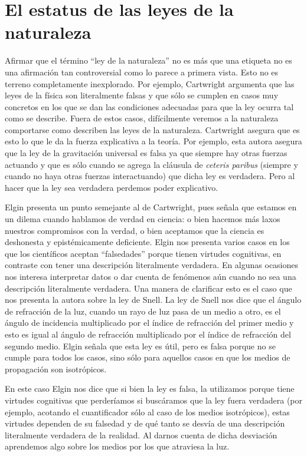 \section{El estatus de las leyes de la naturaleza}

\noindent Afirmar que el término ``ley de la naturaleza'' no es más que una etiqueta no es una afirmación tan controversial como lo parece a primera vista. Esto no es terreno completamente inexplorado. Por ejemplo, Cartwright \citeyear{Cartwright1983} argumenta que las leyes de la física son literalmente falsas y que sólo se cumplen en casos muy concretos en los que se dan las condiciones adecuadas para que la ley ocurra tal como se describe. Fuera de estos casos, difícilmente veremos a la naturaleza comportarse como describen las leyes de la naturaleza. Cartwright asegura que es esto lo que le da la fuerza explicativa a la teoría. Por ejemplo, esta autora asegura que la ley de la gravitación universal es falsa ya que siempre hay otras fuerzas actuando y que es sólo cuando se agrega la cláusula de \textit{ceteris paribus} (siempre y cuando no haya otras fuerzas interactuando) que dicha ley es verdadera. Pero al hacer que la ley sea verdadera perdemos poder explicativo.

Elgin \citeyear{Elgin2004} presenta un punto semejante al de Cartwright, pues señala que estamos en un dilema cuando hablamos de verdad en ciencia: o bien hacemos más laxos nuestros compromisos con la verdad, o bien aceptamos que la ciencia es deshonesta y epistémicamente deficiente. Elgin nos presenta varios casos en los que los científicos aceptan ``falsedades'' porque tienen virtudes cognitivas, en contraste con tener una descripción literalmente verdadera. En algunas ocasiones nos interesa interpretar datos o dar cuenta de fenómenos aún cuando no sea una descripción literalmente verdadera. Una manera de clarificar esto es el caso que nos presenta la autora sobre la ley de Snell. La ley de Snell nos dice que el ángulo de refracción de la luz, cuando un rayo de luz pasa de un medio a otro, es el ángulo de incidencia multiplicado por el índice de refracción del primer medio y esto es igual al ángulo de refracción multiplicado por el índice de refracción del segundo medio. Elgin señala que esta ley es útil, pero es falsa porque no se cumple para todos los casos, sino sólo para aquellos casos en que los medios de propagación son isotrópicos.

En este caso Elgin nos dice que si bien la ley es falsa, la utilizamos porque tiene virtudes cognitivas que perderíamos si buscáramos que la ley fuera verdadera (por ejemplo, acotando el cuantificador sólo al caso de los medios isotrópicos), estas virtudes dependen de su falsedad y de qué tanto se desvía de una descripción literalmente verdadera de la realidad. Al darnos cuenta de dicha desviación aprendemos algo sobre los medios por los que atraviesa la luz.

